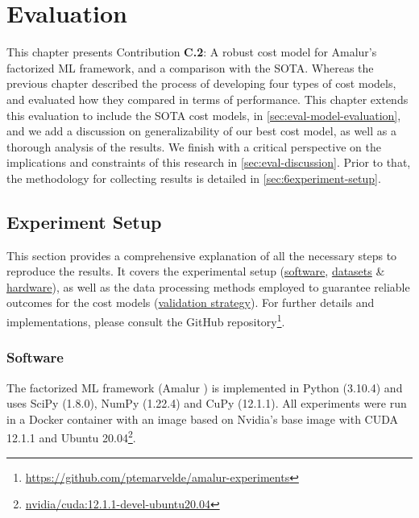 
\chapter{Evaluation}
\label{chapter:evaluation-discussion}
This chapter presents Contribution \textbf{C.2}: A robust cost model for Amalur's factorized ML framework, and a comparison with the SOTA.
Whereas the previous chapter described the process of developing four types of cost models, and evaluated how they compared in terms of performance. This chapter extends this evaluation to include the SOTA cost models, in \autoref{sec:eval-model-evaluation}, and we add a discussion on generalizability of our best cost model, as well as a thorough analysis of the results. We finish with a critical perspective on the implications and constraints of this research in \autoref{sec:eval-discussion}. Prior to that, the methodology for collecting results is detailed in \autoref{sec:6experiment-setup}.

\section{Experiment Setup}
\label{sec:6experiment-setup}
This section provides a comprehensive explanation of all the necessary steps to reproduce the results. It covers the experimental setup (\hyperref[subsec:6-software]{software}, \hyperref[subsec:6-datasets]{datasets} \& \hyperref[subsec:6-hardware]{hardware}), as well as the data processing methods employed to guarantee reliable outcomes for the cost models (\hyperref[subsec:6-validation-strategy]{validation strategy}). For further details and implementations, please consult the GitHub repository\footnote{\url{https://github.com/ptemarvelde/amalur-experiments}}.

\subsection{Software}
\label{subsec:6-software}
The factorized ML framework (Amalur \cite{amalur}) is implemented in Python (3.10.4) and uses SciPy (1.8.0), NumPy (1.22.4) and CuPy (12.1.1). All experiments were run in a Docker container with an image based on Nvidia's base image with CUDA 12.1.1 and Ubuntu 20.04\footnote{\href{https://hub.docker.com/layers/nvidia/cuda/12.1.1-devel-ubuntu20.04/images/sha256-5bd13c67a4479a1c13238b470d89a92937ce68ba5f21b930d50c463e3314f657?context=explore}{nvidia/cuda:12.1.1-devel-ubuntu20.04}}.


